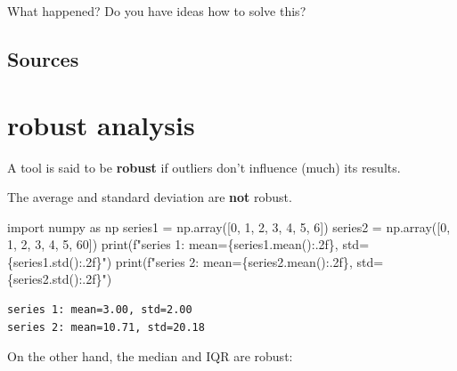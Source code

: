 \documentclass[
  letterpaper,
  DIV=11,
  numbers=noendperiod,
  oneside]{scrreprt}
\newenvironment{Shaded}{\begin{snugshade}}{\end{snugshade}}
\newcommand{\BuiltInTok}[1]{\textcolor[rgb]{0.00,0.23,0.31}{#1}}
\newcommand{\DecValTok}[1]{\textcolor[rgb]{0.68,0.00,0.00}{#1}}
\newcommand{\ImportTok}[1]{\textcolor[rgb]{0.00,0.46,0.62}{#1}}
\newcommand{\NormalTok}[1]{\textcolor[rgb]{0.00,0.23,0.31}{#1}}
\newcommand{\OperatorTok}[1]{\textcolor[rgb]{0.37,0.37,0.37}{#1}}
\newcommand{\SpecialCharTok}[1]{\textcolor[rgb]{0.37,0.37,0.37}{#1}}
\newcommand{\SpecialStringTok}[1]{\textcolor[rgb]{0.13,0.47,0.30}{#1}}
\begin{document}
What happened? Do you have ideas how to solve this?

\hypertarget{sources}{%
\section{Sources}\label{sources}}

\hypertarget{robust-analysis}{%
\chapter{robust analysis}\label{robust-analysis}}

A tool is said to be \textbf{robust} if outliers don't influence (much)
its results.

The average and standard deviation are \textbf{not} robust.

\begin{Shaded}
\begin{Highlighting}[]
\ImportTok{import}\NormalTok{ numpy }\ImportTok{as}\NormalTok{ np}
\NormalTok{series1 }\OperatorTok{=}\NormalTok{ np.array([}\DecValTok{0}\NormalTok{, }\DecValTok{1}\NormalTok{, }\DecValTok{2}\NormalTok{, }\DecValTok{3}\NormalTok{, }\DecValTok{4}\NormalTok{, }\DecValTok{5}\NormalTok{, }\DecValTok{6}\NormalTok{])}
\NormalTok{series2 }\OperatorTok{=}\NormalTok{ np.array([}\DecValTok{0}\NormalTok{, }\DecValTok{1}\NormalTok{, }\DecValTok{2}\NormalTok{, }\DecValTok{3}\NormalTok{, }\DecValTok{4}\NormalTok{, }\DecValTok{5}\NormalTok{, }\DecValTok{60}\NormalTok{])}
\BuiltInTok{print}\NormalTok{(}\SpecialStringTok{f"series 1: mean=}\SpecialCharTok{\{}\NormalTok{series1}\SpecialCharTok{.}\NormalTok{mean()}\SpecialCharTok{:.2f\}}\SpecialStringTok{, std=}\SpecialCharTok{\{}\NormalTok{series1}\SpecialCharTok{.}\NormalTok{std()}\SpecialCharTok{:.2f\}}\SpecialStringTok{"}\NormalTok{)}
\BuiltInTok{print}\NormalTok{(}\SpecialStringTok{f"series 2: mean=}\SpecialCharTok{\{}\NormalTok{series2}\SpecialCharTok{.}\NormalTok{mean()}\SpecialCharTok{:.2f\}}\SpecialStringTok{, std=}\SpecialCharTok{\{}\NormalTok{series2}\SpecialCharTok{.}\NormalTok{std()}\SpecialCharTok{:.2f\}}\SpecialStringTok{"}\NormalTok{)}
\end{Highlighting}
\end{Shaded}

\begin{verbatim}
series 1: mean=3.00, std=2.00
series 2: mean=10.71, std=20.18
\end{verbatim}

On the other hand, the median and IQR are robust:
\end{document}
